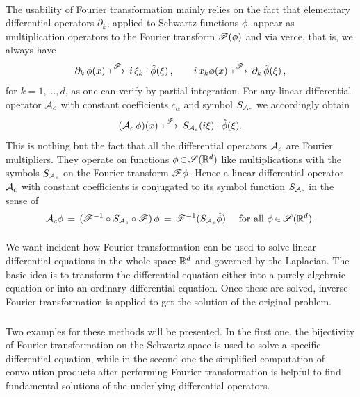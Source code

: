 \documentclass[11pt,twoside]{article}
\begin{document}
\paragraph{} %
The usability of Fourier transformation mainly relies on the fact
that elementary differential operators $\partial_k$,
applied to Schwartz functions $\phi$,
appear as multiplication operators to the Fourier transform $\mathscr{F}(\phi)$
and via verce,
that is, 
we always have
\[
\partial_k \, \phi(x) \, \overset{\mathscr{F}}{\longmapsto}
\, i \, \xi_k \cdot \hat{\phi}(\xi)\,,
\quad \quad
i \, x_k \phi(x) \, \overset{\mathscr{F}}{\longmapsto}
\, \partial_k \, \hat{\phi}(\xi)\,,
\]
for $k=1,\ldots,d$,
as one can verify by partial integration.
For any linear differential operator ${\mathcal{A}}_c$
with constant coefficients $c_{\alpha}$
and symbol $S_{{\mathcal{A}}_c}$ we accordingly obtain 
\[
({\mathcal{A}}_c \, \phi)(x) \, \overset{\mathscr{F}}{\longmapsto} \,
S_{{\mathcal{A}}_c}(i \xi) \cdot \hat{\phi}(\xi).
\]
This is nothing but the fact
that all the differential operators ${\mathcal{A}}_c$ are Fourier multipliers.
They operate on functions $\phi {\,\in\,} \mathscr{S}({\mathbb{R}}^d)$ like multi\-plications
with the symbols $S_{{\mathcal{A}}_c}$ on the Fourier trans\-form $\mathscr{F} \phi$.
Hence a linear differential operator ${\mathcal{A}}_c$ with constant coefficients
is conjugated to its symbol function $S_{{\mathcal{A}}_c}$ in the sense of
\[
{\mathcal{A}}_c \phi \,=\,
(\mathscr{F}^{-1} \circ S_{{\mathcal{A}}_c} \circ \mathscr{F}) \, \phi \,=\,
\mathscr{F}^{-1}(S_{{\mathcal{A}}_c} \hat{\phi})
\quad \mbox{ for all } \phi {\,\in\,} \mathscr{S}({\mathbb{R}}^d).
\]

\paragraph{} %
We want incident
how Fourier transformation can be used
to solve linear differential equations in the whole space ${\mathbb{R}}^d$
and governed by the Laplacian.
The basic idea is to transform the differential equation
either into a purely algebraic equation
or into an ordinary differential equation.
Once these are solved,
inverse Fourier transformation is applied
to get the solution of the original problem.

\subparagraph{}
Two examples for these methods will be presented.
In the first one,
the bijectivity of Fourier transformation on the Schwartz space
is used to solve a specific differential equation,
while in the second one the simplified computation of convolution
products after performing Fourier transformation is helpful
to find fundamental solutions of the underlying differential operators.
\end{document}
